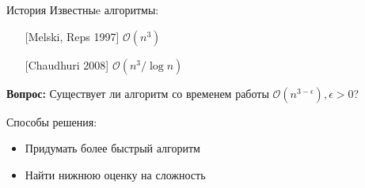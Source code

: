 \documentclass{beamer}
\begin{document}
\begin{frame}{История}
	Известныe алгоритмы: 
	\begin{center}
		\begin{itemize}
			\item[] [Melski, Reps 1997] $\mathcal{O}(n^3)$
			\item[] [Chaudhuri 2008] $\mathcal{O}(n^3 / \log n)$
		\end{itemize}
	\end{center}
	\textbf{Вопрос:} Существует ли алгоритм со временем работы $\mathcal{O}(n^{3-\epsilon}), \epsilon > 0$?
	
	\vspace{1cm}
	Способы решения:
	
	\begin{itemize}
		\item Придумать более быстрый алгоритм
		\item Найти нижнюю оценку на сложность
	\end{itemize}
\end{frame}
\end{document}
